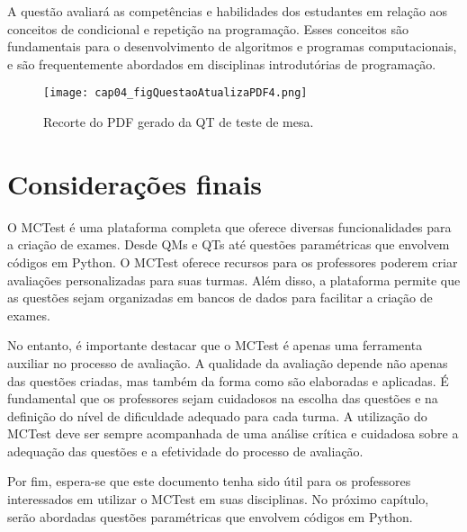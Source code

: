 A questão avaliará as competências e habilidades dos estudantes em relação aos conceitos de condicional e repetição na programação. Esses conceitos são fundamentais para o desenvolvimento de algoritmos e programas computacionais, e são frequentemente abordados em disciplinas introdutórias de programação.


\begin{figure}[!ht]
  \texttt{[image: cap04\_figQuestaoAtualizaPDF4.png]}
  \caption{Recorte do PDF gerado da QT de teste de mesa.}
  \label{fig:cap04_figQuestaoAtualizaPDF4}
\end{figure}

\section{Considerações finais}

O MCTest é uma plataforma completa que oferece diversas funcionalidades para a criação de exames. Desde QMs e QTs até questões paramétricas que envolvem códigos em Python. O MCTest oferece recursos para os professores poderem criar avaliações personalizadas para suas turmas. Além disso, a plataforma permite que as questões sejam organizadas em bancos de dados para facilitar a criação de exames.

No entanto, é importante destacar que o MCTest é apenas uma ferramenta auxiliar no processo de avaliação. A qualidade da avaliação depende não apenas das questões criadas, mas também da forma como são elaboradas e aplicadas. É fundamental que os professores sejam cuidadosos na escolha das questões e na definição do nível de dificuldade adequado para cada turma. A utilização do MCTest deve ser sempre acompanhada de uma análise crítica e cuidadosa sobre a adequação das questões e a efetividade do processo de avaliação.

Por fim, espera-se que este documento tenha sido útil para os professores interessados em utilizar o MCTest em suas disciplinas. No próximo capítulo, serão abordadas questões paramétricas que envolvem códigos em Python. 